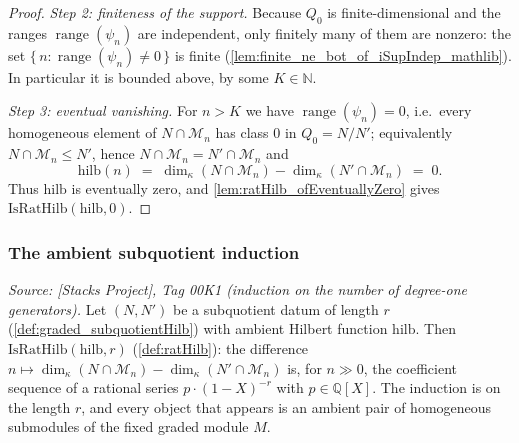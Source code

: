 \begin{proof}
  \emph{Step 2: finiteness of the support.} Because \(Q_0\) is finite-dimensional and
  the ranges \(\operatorname{range}(\psi_n)\) are independent, only finitely many of
  them are nonzero: the set \(\{\,n : \operatorname{range}(\psi_n) \ne 0\,\}\) is
  finite (\cref{lem:finite_ne_bot_of_iSupIndep_mathlib}). In particular it is bounded
  above, by some \(K \in \mathbb{N}\).

  \emph{Step 3: eventual vanishing.} For \(n > K\) we have
  \(\operatorname{range}(\psi_n) = 0\), i.e.\ every homogeneous element of
  \(N \cap \mathcal{M}_n\) has class \(0\) in \(Q_0 = N/N'\); equivalently
  \(N \cap \mathcal{M}_n \le N'\), hence \(N \cap \mathcal{M}_n = N' \cap \mathcal{M}_n\)
  and
  \[
    \mathrm{hilb}(n) \;=\; \dim_\kappa(N \cap \mathcal{M}_n)
      - \dim_\kappa(N' \cap \mathcal{M}_n) \;=\; 0 .
  \]
  Thus \(\mathrm{hilb}\) is eventually zero, and
  \cref{lem:ratHilb_ofEventuallyZero} gives \(\mathrm{IsRatHilb}(\mathrm{hilb}, 0)\).
\end{proof}

\subsubsection*{The ambient subquotient induction}

\begin{lemma}
  \label{lem:graded_subquotient_isRatHilb}
  \textit{Source: [Stacks Project], Tag 00K1 (induction on the number of
  degree-one generators).}
  Let \((N, N')\) be a subquotient datum of length \(r\)
  (\cref{def:graded_subquotientHilb}) with ambient Hilbert function
  \(\mathrm{hilb}\). Then \(\mathrm{IsRatHilb}(\mathrm{hilb}, r)\)
  (\cref{def:ratHilb}): the difference \(n \mapsto \dim_\kappa(N \cap \mathcal{M}_n)
  - \dim_\kappa(N' \cap \mathcal{M}_n)\) is, for \(n \gg 0\), the coefficient
  sequence of a rational series \(p \cdot (1 - X)^{-r}\) with \(p \in
  \mathbb{Q}[X]\). The induction is on the length \(r\), and every object that
  appears is an ambient pair of homogeneous submodules of the fixed graded module
  \(M\).
\end{lemma}

